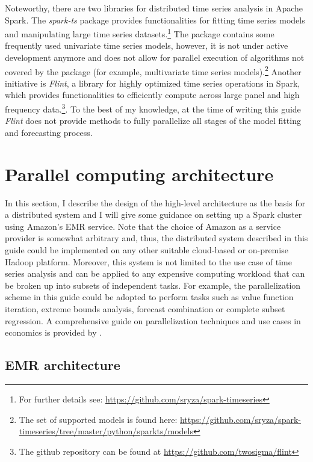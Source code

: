 \documentclass[11pt]{article}
\renewcommand{\cite}{\citet}
\begin{document}
Noteworthy, there are two libraries for distributed time series analysis in Apache Spark. The \emph{spark-ts} package provides functionalities for fitting time series models and manipulating large time series datasets.\footnote{For further details see: \url{https://github.com/sryza/spark-timeseries}} The package contains some frequently used univariate time series models, however, it is not under active development anymore and does not allow for parallel execution of algorithms not covered by the package (for example, multivariate time series models).\footnote{The set of supported models is found here: \url{https://github.com/sryza/spark-timeseries/tree/master/python/sparkts/models}} Another initiative is \emph{Flint}, a library for highly optimized time series operations in Spark, which provides functionalities to efficiently compute across large panel and high frequency data.\footnote{The github repository can be found at \url{https://github.com/twosigma/flint}}. To the best of my knowledge, at the time of writing this guide \emph{Flint} does not provide methods to fully parallelize all stages of the model fitting and forecasting process. 

\section{Parallel computing architecture}
\label{sec:parallel_computing_architecture}

In this section, I describe the design of the high-level architecture as the basis for a distributed system and I will give some guidance on setting up a Spark cluster using Amazon's EMR service. Note that the choice of Amazon as a service provider is somewhat arbitrary and, thus, the distributed system described in this guide could be implemented on any other suitable cloud-based or on-premise Hadoop platform. Moreover, this system is not limited to the use case of time series analysis and can be applied to any expensive computing workload that can be broken up into subsets of independent tasks. For example, the parallelization scheme in this guide could be adopted to perform tasks such as value function iteration, extreme bounds analysis, forecast combination or complete subset regression. A comprehensive guide on parallelization techniques and use cases in economics is provided by \cite{FernandezVillaverde2018}. 

\subsection{EMR architecture}
\label{sec:emr_architecture}
\end{document}
